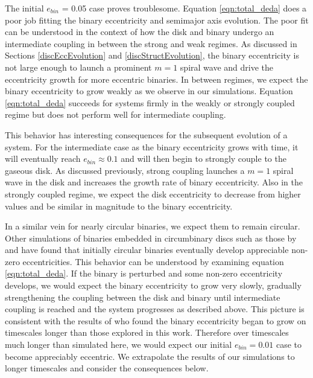 The initial $e_{bin}$ = 0.05 case proves troublesome.  Equation \ref{eqn:total_deda} does a poor job fitting the binary eccentricity and semimajor axis evolution.  The poor fit can be understood in the context of how the disk and binary undergo an intermediate coupling in between the strong and weak regimes.  As discussed in Sections \ref{discEccEvolution} and \ref{discStructEvolution}, the binary eccentricity is not large enough to launch a prominent $m = 1$ spiral wave and drive the eccentricity growth for more eccentric binaries.  In between regimes, we expect the binary eccentricity to grow weakly as we observe in our simulations.  Equation \ref{eqn:total_deda} succeeds for systems firmly in the weakly or strongly coupled regime but does not perform well for intermediate coupling.

This behavior has interesting consequences for the subsequent evolution of a system.  For the intermediate case as the binary eccentricity grows with time, it will eventually reach $e_{bin} \approx 0.1$ and will then begin to strongly couple to the gaseous disk.  As discussed previously, strong coupling launches a $m = 1$ spiral wave in the disk and increases the growth rate of binary eccentricity.  Also in the strongly coupled regime, we expect the disk eccentricity to decrease from higher values and be similar in magnitude to the binary eccentricity.  

In a similar vein for nearly circular binaries, we expect them to remain circular.  Other simulations of binaries embedded in circumbinary discs such as those by \citet{PierensNelson07} and \citet{Cuadra2009} have found that initially circular binaries eventually develop appreciable non-zero eccentricities.  This behavior can be understood by examining equation \ref{eqn:total_deda}.  If the binary is perturbed and some non-zero eccentricity develops, we would expect the binary eccentricity to grow very slowly, gradually strengthening the coupling between the disk and binary until intermediate coupling is reached and the system progresses as described above.  This picture is consistent with the results of \citet{PierensNelson07} who found the binary eccentricity began to grow on timescales longer than those explored in this work.  Therefore over timescales much longer than simulated here, we would expect our initial $e_{bin} = 0.01$ case to become appreciably eccentric.  We extrapolate the results of our simulations to longer timescales and consider the consequences below.

